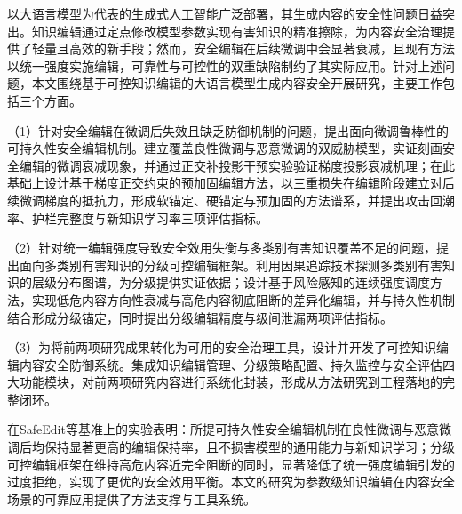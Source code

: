 
\begin{cabstract}
以大语言模型为代表的生成式人工智能广泛部署，其生成内容的安全性问题日益突出。知识编辑通过定点修改模型参数实现有害知识的精准擦除，为内容安全治理提供了轻量且高效的新手段；然而，安全编辑在后续微调中会显著衰减，且现有方法以统一强度实施编辑，可靠性与可控性的双重缺陷制约了其实际应用。针对上述问题，本文围绕基于可控知识编辑的大语言模型生成内容安全开展研究，主要工作包括三个方面。

（1）针对安全编辑在微调后失效且缺乏防御机制的问题，提出面向微调鲁棒性的可持久性安全编辑机制。建立覆盖良性微调与恶意微调的双威胁模型，实证刻画安全编辑的微调衰减现象，并通过正交补投影干预实验验证梯度投影衰减机理；在此基础上设计基于梯度正交约束的预加固编辑方法，以三重损失在编辑阶段建立对后续微调梯度的抵抗力，形成软锚定、硬锚定与预加固的方法谱系，并提出攻击回潮率、护栏完整度与新知识学习率三项评估指标。

（2）针对统一编辑强度导致安全效用失衡与多类别有害知识覆盖不足的问题，提出面向多类别有害知识的分级可控编辑框架。利用因果追踪技术探测多类别有害知识的层级分布图谱，为分级提供实证依据；设计基于风险感知的连续强度调度方法，实现低危内容方向性衰减与高危内容彻底阻断的差异化编辑，并与持久性机制结合形成分级锚定，同时提出分级编辑精度与级间泄漏两项评估指标。

（3）为将前两项研究成果转化为可用的安全治理工具，设计并开发了可控知识编辑内容安全防御系统。集成知识编辑管理、分级策略配置、持久监控与安全评估四大功能模块，对前两项研究内容进行系统化封装，形成从方法研究到工程落地的完整闭环。

在SafeEdit等基准上的实验表明：所提可持久性安全编辑机制在良性微调与恶意微调后均保持显著更高的编辑保持率，且不损害模型的通用能力与新知识学习；分级可控编辑框架在维持高危内容近完全阻断的同时，显著降低了统一强度编辑引发的过度拒绝，实现了更优的安全效用平衡。本文的研究为参数级知识编辑在内容安全场景的可靠应用提供了方法支撑与工具系统。

\end{cabstract}

